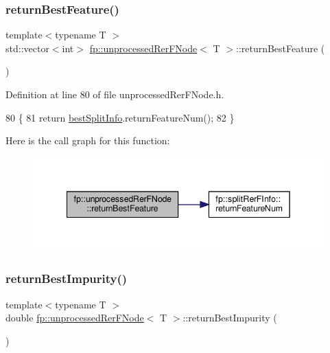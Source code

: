 \subsubsection{\texorpdfstring{return\+Best\+Feature()}{returnBestFeature()}}
{\footnotesize\ttfamily template$<$typename T $>$ \\
std\+::vector$<$int$>$ \hyperlink{classfp_1_1unprocessedRerFNode}{fp\+::unprocessed\+Rer\+F\+Node}$<$ T $>$\+::return\+Best\+Feature (\begin{DoxyParamCaption}{ }\end{DoxyParamCaption})\hspace{0.3cm}{\ttfamily [inline]}}



Definition at line 80 of file unprocessed\+Rer\+F\+Node.\+h.


\begin{DoxyCode}
80                                                          \{
81                     \textcolor{keywordflow}{return} \hyperlink{classfp_1_1unprocessedRerFNode_acf98051b30cb1c0f2e62bb7df51c0884}{bestSplitInfo}.returnFeatureNum();
82                 \}
\end{DoxyCode}
Here is the call graph for this function\+:
\nopagebreak
\begin{figure}[H]
\begin{center}
\leavevmode
\includegraphics[width=342pt]{classfp_1_1unprocessedRerFNode_a99927a98b98f2924f31cf03ece3b5d50_cgraph}
\end{center}
\end{figure}
\mbox{\label{classfp_1_1unprocessedRerFNode_a15b562553cf6417806ee8085ed4a1725}} 
\subsubsection{\texorpdfstring{return\+Best\+Impurity()}{returnBestImpurity()}}
{\footnotesize\ttfamily template$<$typename T $>$ \\
double \hyperlink{classfp_1_1unprocessedRerFNode}{fp\+::unprocessed\+Rer\+F\+Node}$<$ T $>$\+::return\+Best\+Impurity (\begin{DoxyParamCaption}{ }\end{DoxyParamCaption})\hspace{0.3cm}{\ttfamily [inline]}}



